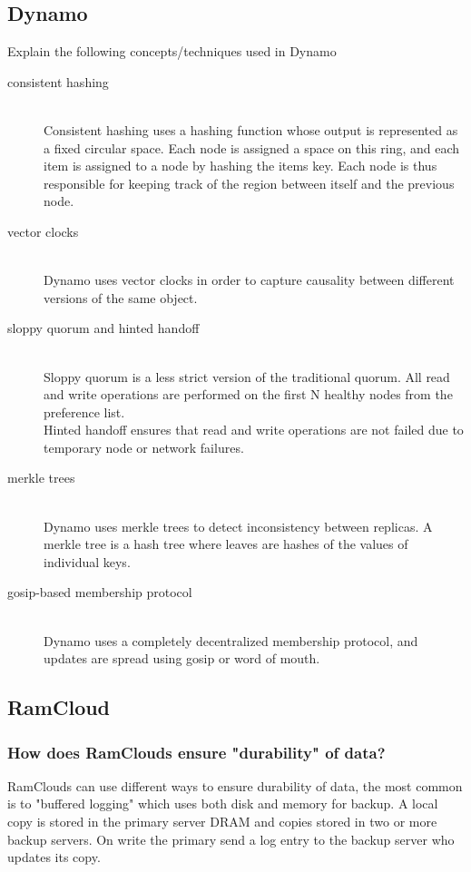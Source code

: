 \documentclass{article}
\begin{document}
\subsection*{Dynamo}
Explain the following concepts/techniques used in Dynamo
\begin{description}
    \item[consistent hashing] \hfill \\
        Consistent hashing uses a hashing function whose output is represented as a fixed circular space. Each node is assigned a
        space on this ring, and each item is assigned to a node by hashing the items key. Each node is thus responsible for
        keeping track of the region between itself and the previous node. 
    \item[vector clocks] \hfill \\
        Dynamo uses vector clocks in order to capture causality between different versions of the same object.
    \item[sloppy quorum and hinted handoff] \hfill \\
        Sloppy quorum is a less strict version of the traditional quorum. All read and write operations are performed on the first N healthy
        nodes from the preference list. \\
        Hinted handoff ensures that read and write operations are not failed due to temporary node or network failures.
    \item[merkle trees] \hfill \\
        Dynamo uses merkle trees to detect inconsistency between replicas. A merkle tree is a hash tree where leaves are hashes of the values
        of individual keys.
    \item[gosip-based membership protocol] \hfill \\
        Dynamo uses a completely decentralized membership protocol, and updates are spread using gosip or word of mouth.
\end{description}
\subsection*{RamCloud}
\subsubsection*{How does RamClouds ensure "durability" of data?}
RamClouds can use different ways to ensure durability of data, the most common is to "buffered logging" which uses both disk and memory 
for backup. A local copy is stored in the primary server DRAM and copies stored in two or more backup servers. On write the primary send a 
log entry to the backup server who updates its copy.
\end{document}
